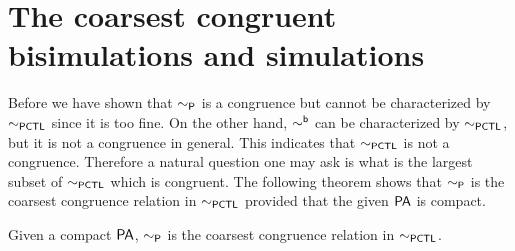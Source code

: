 \documentclass{LMCS}
\newcommand{\BSP}{\ensuremath{\sim_{{\sf P}}}}
\newcommand{\PA}{{\sf PA}}
\newcommand{\PCTL}{{\sf PCTL}}
\newcommand{\iBSB}[1]{\sim_{#1}^{{\sf b}}}
\newcommand{\EPCTL}{\sim_{\PCTL}}
\begin{document}
\section{The coarsest congruent bisimulations and simulations}\label{sec:congruent}
Before we have shown that $\BSP$ is a congruence but cannot be
characterized by $\EPCTL$ since it is too fine. On the
other hand,  $\iBSB{}$ can be characterized by
$\EPCTL$, but it is not a congruence in general. This indicates that 
$\EPCTL$ is not a congruence. Therefore a natural question
one may ask is what is the largest subset of $\EPCTL$ which is
congruent. The following theorem shows that $\BSP$ is the coarsest
congruence relation in $\EPCTL$ provided that the given $\PA$ is compact.
\begin{thm}\label{thm:coarsest}
Given a compact $\PA$, $\BSP$ is the coarsest congruence relation in $\EPCTL$.
\end{thm}
\end{document}
